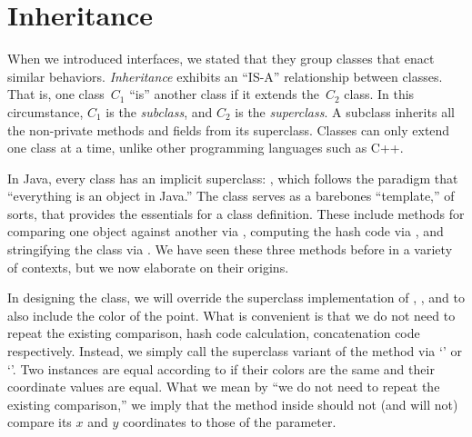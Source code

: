 \section{Inheritance}

When we introduced interfaces, we stated that they group classes that enact similar behaviors. \emph{Inheritance} exhibits an ``IS-A'' relationship between classes. That is, one class~$C_1$ ``is'' another class if it extends the~$C_2$ class. In this circumstance, $C_1$ is the \emph{subclass}, and $C_2$ is the \emph{superclass}. A subclass inherits all the non-private methods and fields from its superclass. Classes can only extend one class at a time, unlike other programming languages such as C++. 

In Java, every class has an implicit superclass: , which follows the paradigm that ``everything is an object in Java.'' The  class serves as a barebones ``template,'' of sorts, that provides the essentials for a class definition. These include methods for comparing one object against another via , computing the hash code via , and stringifying the class via . We have seen these three methods before in a variety of contexts, but we now elaborate on their origins.


In designing the  class, we will override the superclass implementation of , , and  to also include the color of the point. What is convenient is that we do not need to repeat the existing comparison, hash code calculation, concatenation code respectively. Instead, we simply call the superclass variant of the method via `' or `'. Two  instances are equal according to  if their colors are the same and their coordinate values are equal. What we mean by ``we do not need to repeat the existing comparison,'' we imply that the  method inside  should not (and will not) compare its $x$ and $y$ coordinates to those of the parameter.

